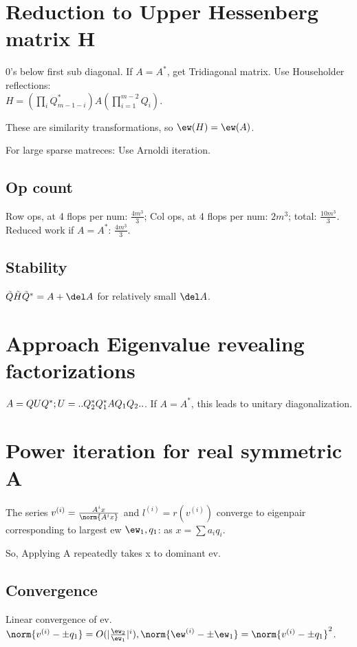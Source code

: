 \documentclass[oneside, article]{memoir}
\begin{document}
\section{Reduction to Upper Hessenberg matrix H}
0's below first sub diagonal. If $A=A^{*}$, get Tridiagonal matrix. Use Householder reflections: \\
$H = (\prod_{i} Q_{m-1-i}^{*})A (\prod^{m-2}_{i=1} Q_{i})$.

These are similarity transformations, so $\ew(H) = \ew(A)$.

For large sparse matreces: Use Arnoldi iteration.

\subsection{Op count}
Row ops, at 4 flops per num: $\frac{4 m^{3}}{3}$; Col ops, at 4 flops per num: $2 m^{3}$; total: $\frac{10 m^{3}}{3}$. Reduced work if $A=A^{*}$: $\frac{4 m^{3}}{3}$.

\subsection{Stability}
$\tilde{Q}\tilde{H}\tilde{Q}^{*} = A + \del A$ for relatively small $\del A$.

\section{Approach Eigenvalue revealing factorizations}
$A = QUQ^{*}; \\
U = ..Q_{2}^{*}Q_{1}^{*}AQ_{1}Q_{2}..$. If $A=A^{*}$, this leads to unitary diagonalization.

\section{Power iteration for real symmetric A}
The series $v^{(i)} = \frac{A^{i}x}{\norm{A^{i}x}}$ and $l^{(i)} = r(v^{(i)})$ converge to eigenpair corresponding to largest ew $\ew_{1}, q_{1}$: as $x = \sum a_{i}q_{i}$.

So, Applying A repeatedly takes x to dominant ev.

\subsection{Convergence}
Linear convergence of ev. $\norm{v^{(i)} - \pm q_{1}} = O(|\frac{\ew_{2}}{\ew_{1}}|^{i}),\\
 \norm{\ew^{(i)} - \pm \ew_{1}} = \norm{v^{(i)} - \pm q_{1}}^{2}$.
\end{document}
